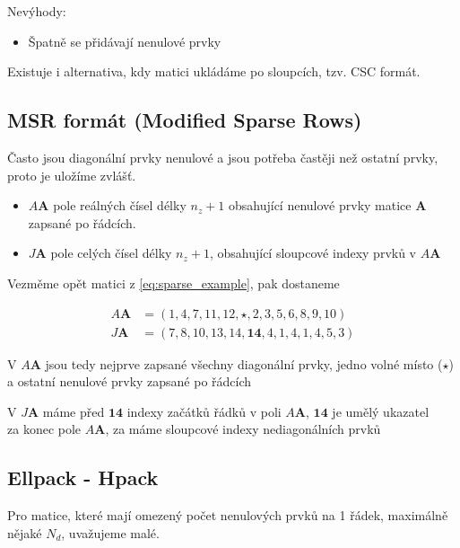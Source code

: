 \documentclass[../main.tex]{subfiles}
\begin{document}
Nevýhody: \begin{itemize}
    \item Špatně se přidávají nenulové prvky
\end{itemize}

Existuje i alternativa, kdy matici ukládáme po sloupcích, tzv. CSC formát.


\subsection{MSR formát (Modified Sparse Rows)}

Často jsou diagonální prvky \matA nenulové a jsou potřeba častěji než ostatní prvky, proto je uložíme zvlášť.




\begin{itemize}
    \item $A\mathbf{A}$ pole reálných čísel délky $n_z +1$ obsahující nenulové prvky matice $\mathbf{A}$ zapsané po řádcích.
    \item $J\mathbf{A}$ pole celých čísel délky $n_z +1$, obsahující sloupcové indexy prvků v $A\mathbf{A}$
    
\end{itemize}

\begin{example}
    Vezměme opět matici z \eqref{eq:sparse_example}, pak dostaneme
    
    \begin{align*}
        A\mathbf{A} &= (1,4,7,11,12,\star,2,3,5,6,8,9,10)\\
        J\mathbf{A} &= (7,8,10,13,14,\mathbf{14},4,1,4,1,4,5,3)
    \end{align*}

    V $A\mathbf{A}$ jsou tedy nejprve zapsané všechny diagonální prvky, jedno volné místo ($\star$) \\
    a ostatní nenulové prvky zapsané po řádcích

    V $J\mathbf{A}$ máme před $\mathbf{14}$ indexy začátků řádků v poli $A\mathbf{A}$, $\mathbf{14}$ je umělý ukazatel\\
    za konec pole $A\mathbf{A}$, za máme sloupcové indexy nediagonálních prvků
\end{example}



\subsection{Ellpack - Hpack}
Pro matice, které mají omezený počet nenulových prvků na 1 řádek, maximálně nějaké $N_d$, uvažujeme malé.
\end{document}
